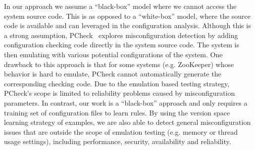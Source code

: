 In our approach we assume a ``black-box'' model where we cannot access the system source code.
This is as opposed to a ``white-box'' model, where the source code is available and can leveraged in the configuration analysis.
Although this is a strong assumption, PCheck~\cite{xu16early} explores misconfiguration detection by adding configuration checking code directly in the system source code.
The system is then emulating with various potential configurations of the system.
One drawback to this approach is that for some systems (e.g. ZooKeeper) whose behavior is hard to emulate, PCheck cannot automatically generate the corresponding checking code.
Due to the emulation based testing strategy, PCheck's scope is limited to reliability problems caused by misconfiguration parameters. 
In contrast, our work is a ``black-box'' approach and only requires a training set of configuration files to learn rules.
By using the version space learning strategy of examples, we are also able to detect general misconfiguration issues that are outside the scope of emulation testing (e.g. memory or thread usage settings), including performance, security, availability and reliability.


\iffalse
\para{Misconfiguration diagnosis}
Misconfiguration diagnosis approaches have been proposed to address configuration problems post-mortem.
For example, ConfAid~\cite{attariyan10automating} 
and X-ray~\cite{attariyan12x-ray} use dynamic information
flow tracking to find possible configuration errors that may have resulted in
failures or performance problems. AutoBash~\cite{su07autobash} 
tracks causality and automatically fixes 
misconfigurations. Unlike our work, most misconfiguration
diagnosis efforts aim at finding errors after system
failures occur, which leads to prolonged recovery time.
\fi
